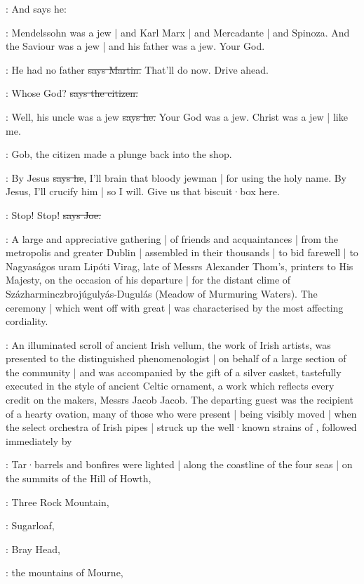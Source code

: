 \Nq:
And says he:

\Bloom:
Mendelssohn was a jew |
and Karl Marx |
and Mercadante |
and Spinoza.
And the Saviour was a jew |
and his father was a jew.
Your God.

\cunningham:
He had no father
\sout{says Martin.}
That'll do now.
Drive ahead.

\citizen:
Whose God?
\sout{says the citizen.}

\Bloom:
Well,
his uncle was a jew
\sout{says he.}
Your God was a jew.
Christ was a jew |
like me.

\Nq:
Gob,
the citizen made a plunge back into the shop.

\citizen:
By Jesus
\sout{says he},
I'll brain that bloody jewman |
for using the holy name.
By Jesus,
I'll crucify him |
so I will.
Give us that biscuit·box here.

\joe:
Stop!
Stop!
\sout{says Joe.}

:
A large and appreciative gathering |
of friends and acquaintances |
from the metropolis and greater Dublin |
assembled in their thousands |
to bid farewell |
to Nagyaságos uram Lipóti Virag,
late of Messrs Alexander Thom's,
printers to His Majesty,
on the occasion of his departure |
for the distant clime of Százharminczbrojúgulyás-Dugulás
(Meadow of Murmuring Waters).
The ceremony |
which went off with great  |
was characterised by the most affecting cordiality.%

:
An illuminated scroll of ancient Irish vellum,
the work of Irish artists,
was presented to the distinguished phenomenologist |
on behalf of a large section of the community |
and was accompanied by the gift of a silver casket,
tastefully executed in the style of ancient Celtic ornament,
a work which reflects every credit on the makers,
Messrs Jacob  Jacob.
The departing guest was the recipient of a hearty ovation,
many of those who were present |
being visibly moved |
when the select orchestra of Irish pipes |
struck up the well·known strains of ,
followed immediately by 

:
Tar·barrels and bonfires were lighted |
along the coastline of the four seas |
on the summits of the Hill of Howth,

:
Three Rock Mountain,

:
Sugarloaf,

:
Bray Head,

:
the mountains of Mourne,

